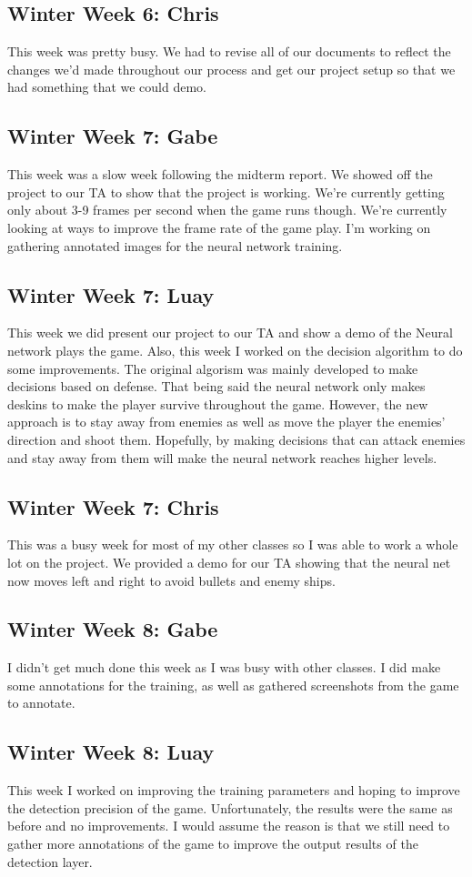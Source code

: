 \documentclass[onecolumn, draftclsnofoot,10pt, compsoc]{IEEEtran}
\begin{document}
\subsection{Winter Week 6: Chris}
This week was pretty busy. We had to revise all of our documents to reflect the changes we'd made throughout our process and get our project setup so that we had something that we could demo.
\subsection{Winter Week 7: Gabe}
This week was a slow week following the midterm report. We showed off the project to our TA to show that the project is working. We're currently getting only about 3-9 frames per second when the game runs though. We're currently looking at ways to improve the frame rate of the game play. I'm working on gathering annotated images for the neural network training.
\subsection{Winter Week 7: Luay}
This week we did present our project to our TA and show a demo of the Neural network plays the game. Also, this week I worked on the decision algorithm to do some improvements. The original algorism was mainly developed to make decisions based on defense. That being said the neural network only makes deskins to make the player survive throughout the game. However, the new approach is to stay away from enemies as well as move the player the enemies’ direction and shoot them. Hopefully, by making decisions that can attack enemies and stay away from them will make the neural network reaches higher levels.
\subsection{Winter Week 7: Chris}
This was a busy week for most of my other classes so I was able to work a whole lot on the project. We provided a demo for our TA showing that the neural net now moves left and right to avoid bullets and enemy ships.
\subsection{Winter Week 8: Gabe}
I didn't get much done this week as I was busy with other classes. I did make some annotations for the training, as well as gathered screenshots from the game to annotate.
\subsection{Winter Week 8: Luay}
This week I worked on improving the training parameters and hoping to improve the detection precision of the game. Unfortunately, the results were the same as before and no improvements. I would assume the reason is that we still need to gather more annotations of the game to improve the output results of the detection layer.
\end{document}
